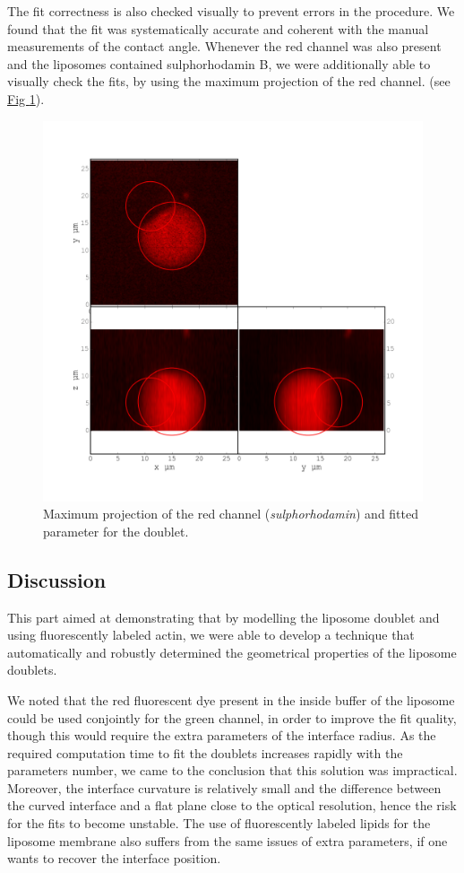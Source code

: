 \documentclass[A4paperpaper,11pt,english]{sphinxmanual}
\begin{document}
The fit correctness is also checked visually to prevent errors in the
procedure.  We found that the fit was systematically accurate and coherent with the manual
measurements of the contact angle.  Whenever the red channel was also present and the liposomes
contained sulphorhodamin B, we were additionally able to visually check the fits, by using the maximum
projection of the red channel.  (see \hyperref[index-latex:srhod]{Fig  \ref*{index-latex:srhod}}).
\begin{figure}[htbp]
\centering
\capstart

\includegraphics[width=0.800\linewidth]{srhod_superimpose.png}
\caption{Maximum projection of the red channel (\emph{sulphorhodamin}) and fitted
parameter for the doublet.}\label{index-latex:srhod}\end{figure}


\subsection{Discussion}
\label{index-latex:id24}
This part aimed at demonstrating that by modelling the liposome doublet and using
fluorescently labeled actin, we were able to develop a technique that
automatically and robustly determined the geometrical properties of the liposome
doublets.

We noted that the red fluorescent dye present in the inside buffer of the
liposome could be used conjointly for the green channel, in order to improve the
fit quality, though this would require the extra parameters of the
interface radius. As the required computation time to fit the doublets increases
rapidly with the parameters number,
we came to the conclusion that this solution was impractical.  Moreover, the interface curvature is relatively small
and the difference between the curved interface and a flat plane close to
the optical resolution, hence the risk for the fits to become unstable.  The use of
fluorescently labeled lipids for the liposome membrane also suffers from the
same issues of extra parameters, if one wants to recover the interface position.
\end{document}
